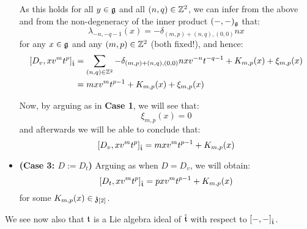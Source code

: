 \begin{remark}
\begin{itemize}
                    As this holds for all $y \in \mathfrak{g}$ and all $(n, q) \in \mathbb{Z}^2$, we can infer from the above and from the non-degeneracy of the inner product $(-, -)_{\mathfrak{g}}$ that:
                        $$\lambda_{-n, -q - 1}(x) = -\delta_{(m, p) + (n, q), (0, 0)} n x$$
                    for any $x \in \mathfrak{g}$ and any $(m, p) \in \mathbb{Z}^2$ (both fixed!), and hence:
                        $$
                            \begin{aligned}
                                [D_v, x v^m t^p]_{\hat{\t}} & = \sum_{(n, q) \in \Z^2} -\delta_{(m, p) + (n, q), (0, 0)} n x v^{-n} t^{-q - 1} + K_{m, p}(x) + \xi_{m, p}(x)
                                \\
                                & = m x v^m t^{p - 1} + K_{m, p}(x) + \xi_{m, p}(x)
                            \end{aligned}
                        $$

                    Now, by arguing as in \textbf{Case 1}, we will see that:
                        $$\xi_{m, p}(x) = 0$$
                    and afterwards we will be able to conclude that:
                        $$[D_v, x v^m t^p]_{\hat{\mathfrak{t}}} = m x v^m t^{p - 1} + K_{m, p}(x)$$
                    \item \textbf{(Case 3: $D := D_t$)} Arguing as when $D = D_v$, we will obtain:
                        $$[D_t, x v^m t^p]_{\hat{\mathfrak{t}}} = p x v^m t^{p - 1} + K_{m, p}(x)$$
                    for some $K_{m, p}(x) \in \mathfrak{z}_{[2]}$.
                \end{itemize}
            \end{remark}
            \begin{remark}
                We see now also that $\mathfrak{t}$ is a Lie algebra ideal of $\hat{\mathfrak{t}}$ with respect to $[-, -]_{\hat{\mathfrak{t}}}$.
            \end{remark}

